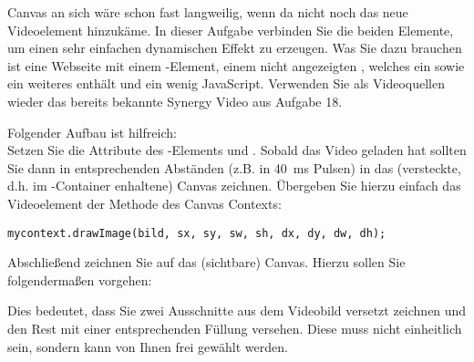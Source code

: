 %
\par Canvas an sich wäre schon fast langweilig, wenn da nicht noch das neue
Videoelement hinzukäme. In dieser Aufgabe verbinden Sie die beiden Elemente, um
einen sehr einfachen dynamischen Effekt zu erzeugen. Was Sie dazu brauchen ist
eine Webseite mit einem -Element, einem nicht angezeigten
, welches ein  sowie ein weiteres  enthält und
ein wenig JavaScript. Verwenden Sie als Videoquellen wieder das bereits
bekannte Synergy Video aus Aufgabe 18.
%
\par Folgender Aufbau ist hilfreich: \\Setzen Sie die Attribute des
-Elements  und . Sobald das
Video geladen hat sollten Sie dann in entsprechenden Abständen (z.B. in
\qty{40}{ms} Pulsen) in das (versteckte, d.h. im -Container
enhaltene) Canvas zeichnen. Übergeben Sie hierzu einfach das Videoelement der
 Methode des Canvas Contexts:
%
\begin{lstlisting}
mycontext.drawImage(bild, sx, sy, sw, sh, dx, dy, dw, dh);
\end{lstlisting}
%
\par Abschließend zeichnen Sie auf das (sichtbare) Canvas. Hierzu sollen Sie
folgendermaßen vorgehen:
%


\par Dies bedeutet, dass Sie zwei Ausschnitte aus dem Videobild versetzt
zeichnen und den Rest mit einer entsprechenden Füllung versehen. Diese muss
nicht einheitlich sein, sondern kann von Ihnen frei gewählt werden.
